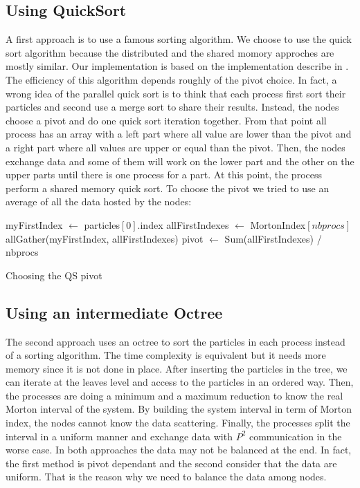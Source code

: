 \documentclass[10pt,letterpaper,titlepage]{report}
\begin{document}
\subsection{Using QuickSort}
A first approach is to use a famous sorting algorithm.
We choose to use the quick sort algorithm because the distributed and the shared momory approches are mostly similar.
Our implementation is based on the implementation describe in \cite{itpc03}.
The efficiency of this algorithm depends roughly of the pivot choice.
In fact, a wrong idea of the parallel quick sort is to think that each process first sort their particles and second use a merge sort to share their results.
Instead, the nodes choose a pivot and do one quick sort iteration together.
From that point all process has an array with a left part where all value are lower than the pivot and a right part where all values are upper or equal than the pivot.
Then, the nodes exchange data and some of them will work on the lower part and the other on the upper parts until there is one process for a part.
At this point, the process perform a shared memory quick sort.
To choose the pivot we tried to use an average of all the data hosted by the nodes:
\newline

\begin{algorithm}[H]
\SetLine
{}
\BlankLine
myFirstIndex $\leftarrow$ particles$[0]$.index\;
allFirstIndexes $\leftarrow$ MortonIndex$[nbprocs]$\;
allGather(myFirstIndex, allFirstIndexes)\;
pivot $\leftarrow$ Sum(allFirstIndexes) / nbprocs\;
\BlankLine
\caption{Choosing the QS pivot}
\end{algorithm}


\subsection{Using an intermediate Octree}
The second approach uses an octree to sort the particles in each process instead of a sorting algorithm.
The time complexity is equivalent but it needs more memory since it is not done in place.
After inserting the particles in the tree, we can iterate at the leaves level and access to the particles in an ordered way.
Then, the processes are doing a minimum and a maximum reduction to know the real Morton interval of the system.
By building the system interval in term of Morton index, the nodes cannot know the data scattering.
Finally, the processes split the interval in a uniform manner and exchange data with $P^{2}$ communication in the worse case.
\newline
\newline
In both approaches the data may not be balanced at the end.
In fact, the first method is pivot dependant and the second consider that the data are uniform.
That is the reason why we need to balance the data among nodes.
\end{document}
